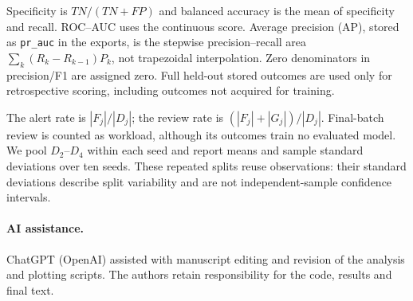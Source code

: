 \begin{revised}
Specificity is $TN/(TN+FP)$ and balanced accuracy is the mean of specificity
and recall. ROC--AUC uses the continuous score. Average precision (AP),
stored as \texttt{pr\_auc} in the exports, is the stepwise precision--recall
area $\sum_k(R_k-R_{k-1})P_k$, not trapezoidal interpolation. Zero denominators
in precision/F1 are assigned zero. Full held-out stored outcomes are used
only for retrospective scoring, including outcomes not acquired for training.

The alert rate is $|F_j|/|D_j|$; the review rate is
$(|F_j|+|G_j|)/|D_j|$. Final-batch review is counted as workload, although its
outcomes train no evaluated model. We pool $D_2$--$D_4$ within each seed and
report means and sample standard deviations over ten seeds. These repeated
splits reuse observations: their standard deviations describe split
variability and are not independent-sample confidence intervals.
\paragraph{AI assistance.}
ChatGPT (OpenAI) assisted with manuscript editing and revision of the
analysis and plotting scripts. The authors retain responsibility for the
code, results and final text.
\end{revised}
